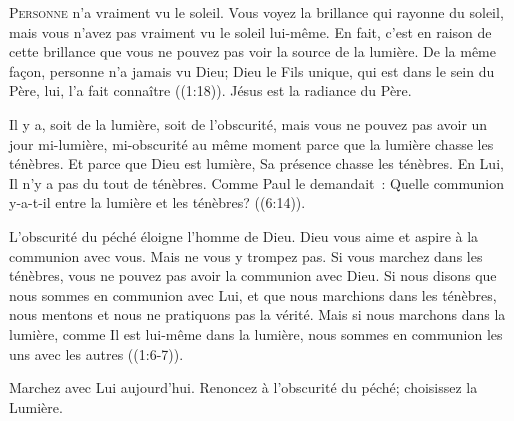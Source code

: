\dvrule






\lettrine{P}{ersonne} n'a vraiment vu le soleil. Vous voyez la brillance
 qui rayonne du soleil, mais vous n'avez pas vraiment vu le soleil lui-même.
 En fait, c'est en raison de cette brillance que vous ne pouvez pas voir
 la source de la lumière. De la même façon,
 \og personne 
 n'a jamais vu Dieu; Dieu le Fils unique, qui est dans le sein du Père, lui,
 l'a fait connaître \fg{} ((1:18)).
 Jésus est la radiance du Père.


Il y a, soit de la lumière, soit de l'obscurité, mais vous ne pouvez pas
 avoir un jour mi-lumière, mi-obscurité au même moment parce que la lumière
 chasse les ténèbres. Et parce que Dieu est lumière, Sa présence chasse
 les ténèbres. En Lui, Il n'y a pas du tout de ténèbres.
 Comme Paul le demandait~: 
 \og Quelle communion y-a-t-il entre la lumière et les ténèbres? \fg{}
 ((6:14)).

L'obscurité du péché éloigne l'homme de Dieu. Dieu vous aime et aspire
 à la communion avec vous. Mais ne vous y trompez pas.
 Si vous marchez dans les ténèbres, vous ne pouvez pas avoir
 la communion avec Dieu.
 \og Si nous disons que nous sommes en communion avec Lui,
 et que nous marchions dans les ténèbres, nous mentons et nous ne pratiquons
 pas la vérité. Mais si nous marchons dans la lumière,
 comme Il est lui-même dans la lumière, nous sommes en communion
 les uns avec les autres \fg{} ((1:6-7)).

Marchez avec Lui aujourd'hui. Renoncez à l'obscurité du péché;
 choisissez la Lumière.


\dvrule


